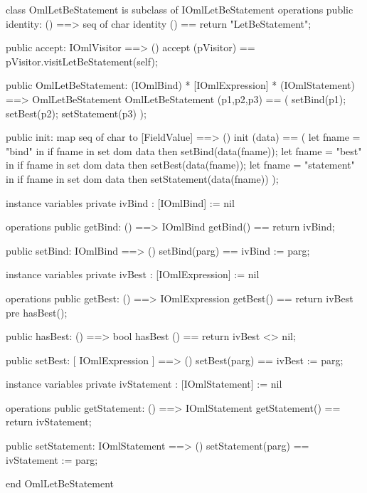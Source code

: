 \begin{vdm_al}
class OmlLetBeStatement is subclass of IOmlLetBeStatement
operations
  public identity: () ==> seq of char
  identity () == return "LetBeStatement";

  public accept: IOmlVisitor ==> ()
  accept (pVisitor) == pVisitor.visitLetBeStatement(self);

  public OmlLetBeStatement:
      (IOmlBind) *
      [IOmlExpression] *
      (IOmlStatement) ==> OmlLetBeStatement
  OmlLetBeStatement (p1,p2,p3) == 
   ( setBind(p1);
     setBest(p2);
     setStatement(p3) );

  public init: map seq of char to [FieldValue] ==> ()
  init (data) ==
    ( let fname = "bind" in
        if fname in set dom data
        then setBind(data(fname));
      let fname = "best" in
        if fname in set dom data
        then setBest(data(fname));
      let fname = "statement" in
        if fname in set dom data
        then setStatement(data(fname)) );

instance variables
  private ivBind : [IOmlBind] := nil

operations
  public getBind: () ==> IOmlBind
  getBind() == return ivBind;

  public setBind: IOmlBind ==> ()
  setBind(parg) == ivBind := parg;

instance variables
  private ivBest : [IOmlExpression] := nil

operations
  public getBest: () ==> IOmlExpression
  getBest() == return ivBest
    pre hasBest();

  public hasBest: () ==> bool
  hasBest () == return ivBest <> nil;

  public setBest: [ IOmlExpression ] ==> ()
  setBest(parg) == ivBest := parg;

instance variables
  private ivStatement : [IOmlStatement] := nil

operations
  public getStatement: () ==> IOmlStatement
  getStatement() == return ivStatement;

  public setStatement: IOmlStatement ==> ()
  setStatement(parg) == ivStatement := parg;

end OmlLetBeStatement
\end{vdm_al}

